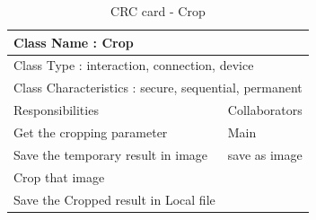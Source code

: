 \begin{table}[t]
\begin{tabular}{|p{7cm}|p{7cm}|}
  \hline
  \multicolumn{2}{|l|}{ Class Name : Crop} \\
  \hline
  \multicolumn{2}{|l|}{ Class Type : interaction, connection, device} \\
  \hline
  \multicolumn{2}{|l|}{ Class Characteristics : secure, sequential, permanent} \\
  \hline
  Responsibilities & Collaborators  \\
  \hline
  Get the cropping parameter & Main \\
  Save the temporary result in image & save as image \\
  Crop that image & \\
  Save the Cropped result in Local file & \\
  \hline
\end{tabular}
\caption[CRC card - Crop]{CRC card - Crop}
\end{table}
